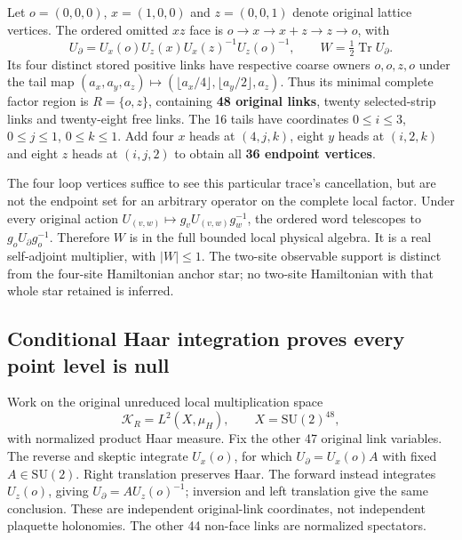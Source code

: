 Let $o=(0,0,0)$, $x=(1,0,0)$ and $z=(0,0,1)$ denote original lattice vertices. The ordered omitted $xz$ face is $o\to x\to x+z\to z\to o$, with
\begin{equation}
 U_\partial=U_x(o)U_z(x)U_x(z)^{-1}U_z(o)^{-1},
 \qquad W=\tfrac12\operatorname{Tr}U_\partial.
 \label{eq:aj2-W}
\end{equation}
Its four distinct stored positive links have respective coarse owners $o,o,z,o$ under the tail map $(a_x,a_y,a_z)\mapsto(\lfloor a_x/4\rfloor,\lfloor a_y/2\rfloor,a_z)$. Thus its minimal complete factor region is $R=\{o,z\}$, containing \textbf{48 original links}, twenty selected-strip links and twenty-eight free links. The 16 tails have coordinates $0\le i\le3$, $0\le j\le1$, $0\le k\le1$. Add four $x$ heads at $(4,j,k)$, eight $y$ heads at $(i,2,k)$ and eight $z$ heads at $(i,j,2)$ to obtain all \textbf{36 endpoint vertices}.

The four loop vertices suffice to see this particular trace's cancellation, but are not the endpoint set for an arbitrary operator on the complete local factor. Under every original action $U_{(v,w)}\mapsto g_vU_{(v,w)}g_w^{-1}$, the ordered word telescopes to $g_oU_\partial g_o^{-1}$. Therefore $W$ is in the full bounded local physical algebra. It is a real self-adjoint multiplier, with $|W|\le1$. The two-site observable support is distinct from the four-site Hamiltonian anchor star; no two-site Hamiltonian with that whole star retained is inferred.

\subsection{Conditional Haar integration proves every point level is null}
Work on the original unreduced local multiplication space
\begin{equation}
 \mathcal K_R=L^2(X,\mu_H),\qquad
 X=\mathrm{SU}(2)^{48},
\end{equation}
with normalized product Haar measure. Fix the other 47 original link variables. The reverse and skeptic integrate $U_x(o)$, for which $U_\partial=U_x(o)A$ with fixed $A\in\mathrm{SU}(2)$. Right translation preserves Haar. The forward instead integrates $U_z(o)$, giving $U_\partial=A U_z(o)^{-1}$; inversion and left translation give the same conclusion. These are independent original-link coordinates, not independent plaquette holonomies. The other 44 non-face links are normalized spectators.

